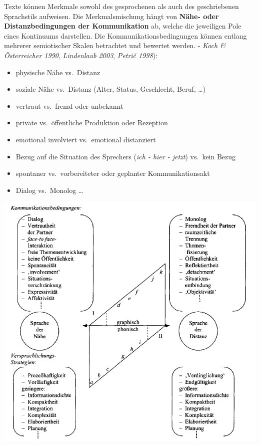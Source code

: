 \documentclass[
  letterpaper,
  DIV=11,
  numbers=noendperiod]{scrreprt}
\providecommand{\tightlist}{%
  \setlength{\itemsep}{0pt}\setlength{\parskip}{0pt}}\usepackage{longtable,booktabs,array}
\begin{document}
Texte können Merkmale sowohl des gesprochenen als auch des geschriebenen
Sprachstils aufweisen. Die Merkmalsmischung hängt von \textbf{Nähe- oder
Distanzbedingungen der Kommunikation} ab, welche die jeweiligen Pole
eines Kontinuums darstellen. Die Kommunikationsbedingungen können
entlang mehrerer semiotischer Skalen betrachtet und bewertet werden. -
\emph{Koch \& Österreicher 1990}, \emph{Lindenlaub 2003}, \emph{Petrič
1998}):

\begin{itemize}
\tightlist
\item
  physische Nähe vs.~Distanz\\
\item
  soziale Nähe vs.~Distanz (Alter, Status, Geschlecht, Beruf, \ldots)\\
\item
  vertraut vs.~fremd oder unbekannt\\
\item
  private vs.~öffentliche Produktion oder Rezeption\\
\item
  emotional involviert vs.~emotional distanziert\\
\item
  Bezug auf die Situation des Sprechers (\emph{ich - hier - jetzt})
  vs.~kein Bezug\\
\item
  spontaner vs.~vorbereiteter oder geplanter Kommunikationsakt\\
\item
  Dialog vs.~Monolog \ldots{}
\end{itemize}

\includegraphics[width=1\textwidth,height=\textheight]{./pictures/nahe_distanz_diagram1.png}
\end{document}
